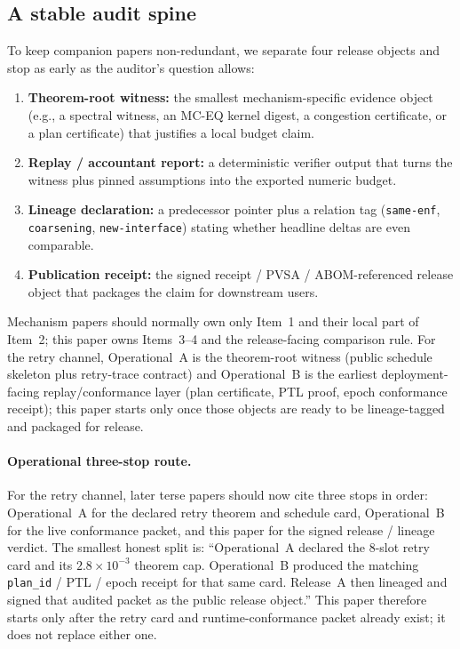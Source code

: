 \documentclass[11pt]{article}
\begin{document}
\subsection{A stable audit spine}
To keep companion papers non-redundant, we separate four release objects and stop as early as the auditor's question allows:
\begin{enumerate}[leftmargin=1.4em]
\item \textbf{Theorem-root witness:} the smallest mechanism-specific evidence object (e.g., a spectral witness, an MC-EQ kernel digest, a congestion certificate, or a plan certificate) that justifies a local budget claim.
\item \textbf{Replay / accountant report:} a deterministic verifier output that turns the witness plus pinned assumptions into the exported numeric budget.
\item \textbf{Lineage declaration:} a predecessor pointer plus a relation tag (\texttt{same-enf}, \texttt{coarsening}, \texttt{new-interface}) stating whether headline deltas are even comparable.
\item \textbf{Publication receipt:} the signed receipt / PVSA / ABOM-referenced release object that packages the claim for downstream users.
\end{enumerate}
Mechanism papers should normally own only Item~1 and their local part of Item~2; this paper owns Items~3--4 and the release-facing comparison rule.
For the retry channel, Operational~A is the theorem-root witness (public schedule skeleton plus retry-trace contract) and Operational~B is the earliest deployment-facing replay/conformance layer (plan certificate, PTL proof, epoch conformance receipt); this paper starts only once those objects are ready to be lineage-tagged and packaged for release.\cite{series:schedretries,series:proofcarryingbudgets}

\paragraph{Operational three-stop route.}
For the retry channel, later terse papers should now cite three stops in order: Operational~A for the declared retry theorem and schedule card, Operational~B for the live conformance packet, and this paper for the signed release / lineage verdict.
The smallest honest split is: ``Operational~A declared the $8$-slot retry card and its $2.8\times 10^{-3}$ theorem cap. Operational~B produced the matching \texttt{plan\_id} / PTL / epoch receipt for that same card. Release~A then lineaged and signed that audited packet as the public release object.''
This paper therefore starts only after the retry card and runtime-conformance packet already exist; it does not replace either one.\cite{series:schedretries,series:proofcarryingbudgets}
\end{document}
